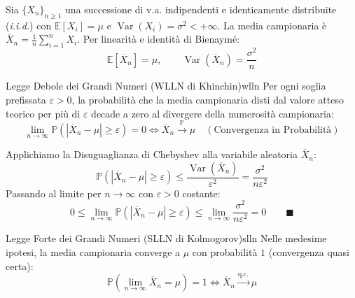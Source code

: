 Sia $\{X_n\}_{n \ge 1}$ una successione di v.a. indipendenti e identicamente distribuite (\emph{i.i.d.}) con $\mathbb{E}[X_i] = \mu$ e $\operatorname{Var}(X_i) = \sigma^2 < +\infty$.
La media campionaria è $\overline{X}_n = \frac{1}{n}\sum_{i=1}^n X_i$.
Per linearità e identità di Bienaymé:
\begin{equation}
    \mathbb{E}[\overline{X}_n] = \mu, \qquad \operatorname{Var}(\overline{X}_n) = \frac{\sigma^2}{n}
\end{equation}

\begin{teorema}{Legge Debole dei Grandi Numeri (WLLN di Khinchin)}{wlln}
Per ogni soglia prefissata $\varepsilon > 0$, la probabilità che la media campionaria disti dal valore atteso teorico per più di $\varepsilon$ decade a zero al divergere della numerosità campionaria:
\begin{equation}
    \lim_{n \to \infty} \mathbb{P}(|\overline{X}_n - \mu| \ge \varepsilon) = 0 \iff \overline{X}_n \xrightarrow{\mathbb{P}} \mu \quad (\text{Convergenza in Probabilità})
\end{equation}
\end{teorema}

\begin{dimostrazione}
Applichiamo la Disuguaglianza di Chebyshev alla variabile aleatoria $\overline{X}_n$:
\begin{equation}
    \mathbb{P}(|\overline{X}_n - \mu| \ge \varepsilon) \le \frac{\operatorname{Var}(\overline{X}_n)}{\varepsilon^2} = \frac{\sigma^2}{n \varepsilon^2}
\end{equation}
Passando al limite per $n \to \infty$ con $\varepsilon > 0$ costante:
\begin{equation}
    0 \le \lim_{n \to \infty} \mathbb{P}(|\overline{X}_n - \mu| \ge \varepsilon) \le \lim_{n \to \infty} \frac{\sigma^2}{n \varepsilon^2} = 0 \qquad \blacksquare
\end{equation}
\end{dimostrazione}

\begin{teorema}{Legge Forte dei Grandi Numeri (SLLN di Kolmogorov)}{slln}
Nelle medesime ipotesi, la media campionaria converge a $\mu$ con probabilità $1$ (convergenza quasi certa):
\begin{equation}
    \mathbb{P}\left(\lim_{n \to \infty} \overline{X}_n = \mu\right) = 1 \iff \overline{X}_n \xrightarrow{\text{q.c.}} \mu
\end{equation}
\end{teorema}

